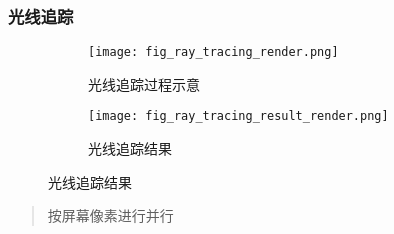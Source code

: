 \begin{frame}
    \frametitle{光线追踪}
    \begin{figure}[ht!]
        \centering
        \begin{subfigure}{0.48\textwidth}
            \centering
            \texttt{[image: fig\_ray\_tracing\_render.png]}
            \caption{光线追踪过程示意}
        \end{subfigure}
        \begin{subfigure}{0.48\textwidth}
            \texttt{[image: fig\_ray\_tracing\_result\_render.png]}
            \caption{光线追踪结果}
        \end{subfigure}
    \end{figure}
    \begin{quote}
        按屏幕像素进行并行
    \end{quote}
\end{frame}
